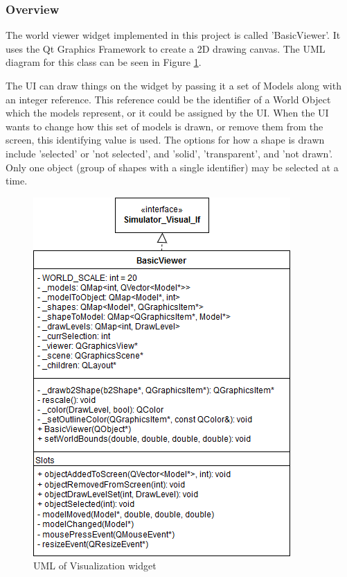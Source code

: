 \subsubsection*{Overview}
The world viewer widget implemented in this project is called 'BasicViewer'. It uses the Qt Graphics Framework to create a 2D drawing canvas. The UML diagram for this class can be seen in Figure \ref{uml:viewwidget}.

The UI can draw things on the widget by passing it a set of Models along with an integer reference. This reference could be the identifier of a World Object which the models represent, or it could be assigned by the UI. When the UI wants to change how this set of models is drawn, or remove them from the screen, this identifying value is used.
The options for how a shape is drawn include 'selected' or 'not selected', and 'solid', 'transparent', and 'not drawn'. Only one object (group of shapes with a single identifier) may be selected at a time.
 \begin{figure}
 	\begin{center}
 	\includegraphics[scale=0.5]{./images_design/uml/BasicViewer}
 	\caption{UML of Visualization widget\label{uml:viewwidget}}
 	\end{center}
 \end{figure}
 
